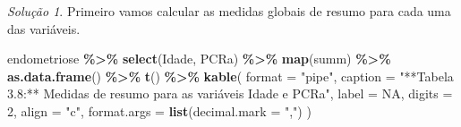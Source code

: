 \documentclass[
]{latex/krantz}
\newenvironment{Shaded}{\begin{snugshade}}{\end{snugshade}}
\newcommand{\AttributeTok}[1]{\textcolor[rgb]{0.13,0.29,0.53}{#1}}
\newcommand{\ConstantTok}[1]{\textcolor[rgb]{0.56,0.35,0.01}{#1}}
\newcommand{\DecValTok}[1]{\textcolor[rgb]{0.00,0.00,0.81}{#1}}
\newcommand{\FunctionTok}[1]{\textcolor[rgb]{0.13,0.29,0.53}{\textbf{#1}}}
\newcommand{\NormalTok}[1]{#1}
\newcommand{\SpecialCharTok}[1]{\textcolor[rgb]{0.81,0.36,0.00}{\textbf{#1}}}
\newcommand{\StringTok}[1]{\textcolor[rgb]{0.31,0.60,0.02}{#1}}
\theoremstyle{definition}
\theoremstyle{definition}
\theoremstyle{definition}
\theoremstyle{definition}
\theoremstyle{remark}
\newtheorem*{solution}{Solução}
\begin{document}
\begin{solution}
Primeiro vamos calcular as medidas globais de resumo para cada uma das variáveis.

\begin{Shaded}
\begin{Highlighting}[]
\NormalTok{endometriose }\SpecialCharTok{\%\textgreater{}\%}
  \FunctionTok{select}\NormalTok{(Idade, PCRa) }\SpecialCharTok{\%\textgreater{}\%}
  \FunctionTok{map}\NormalTok{(summ) }\SpecialCharTok{\%\textgreater{}\%}
  \FunctionTok{as.data.frame}\NormalTok{() }\SpecialCharTok{\%\textgreater{}\%}
  \FunctionTok{t}\NormalTok{() }\SpecialCharTok{\%\textgreater{}\%}
  \FunctionTok{kable}\NormalTok{(}
    \AttributeTok{format =} \StringTok{"pipe"}\NormalTok{,}
    \AttributeTok{caption =} \StringTok{"**Tabela 3.8:** Medidas de resumo para as variáveis \textasciigrave{}Idade\textasciigrave{} e \textasciigrave{}PCRa\textasciigrave{}"}\NormalTok{,}
    \AttributeTok{label =} \ConstantTok{NA}\NormalTok{,}
    \AttributeTok{digits =} \DecValTok{2}\NormalTok{,}
    \AttributeTok{align =} \StringTok{"c"}\NormalTok{,}
    \AttributeTok{format.args =} \FunctionTok{list}\NormalTok{(}\AttributeTok{decimal.mark =} \StringTok{","}\NormalTok{)}
\NormalTok{  )}
\end{Highlighting}
\end{Shaded}


\end{solution}
\end{document}
